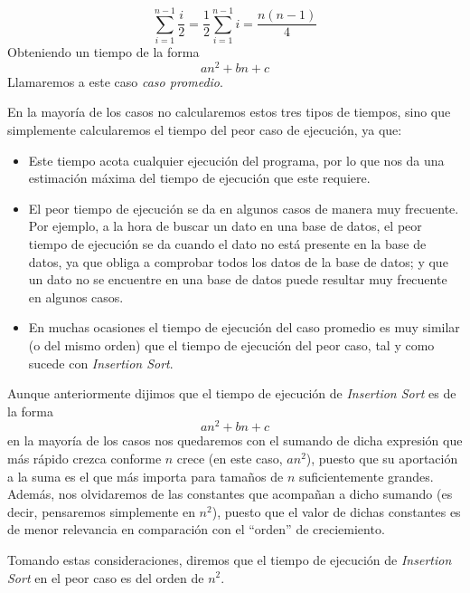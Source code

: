 \begin{itemize}
        \begin{equation*}
            \sum_{i=1}^{n-1} \frac{i}{2} = \frac{1}{2}\sum_{i=1}^{n-1} i = \dfrac{n(n-1)}{4}
        \end{equation*}
        Obteniendo un tiempo de la forma
        \begin{equation*}
            an^2 + bn + c
        \end{equation*}
        Llamaremos a este caso \textit{caso promedio}.
\end{itemize}

En la mayoría de los casos no calcularemos estos tres tipos de tiempos, sino que simplemente calcularemos el tiempo del peor caso de ejecución, ya que:
\begin{itemize}
    \item Este tiempo acota cualquier ejecución del programa, por lo que nos da una estimación máxima del tiempo de ejecución que este requiere.
    \item El peor tiempo de ejecución se da en algunos casos de manera muy frecuente. Por ejemplo, a la hora de buscar un dato en una base de datos, el peor tiempo de ejecución se da cuando el dato no está presente en la base de datos, ya que obliga a comprobar todos los datos de la base de datos; y que un dato no se encuentre en una base de datos puede resultar muy frecuente en algunos casos.
    \item En muchas ocasiones el tiempo de ejecución del caso promedio es muy similar (o del mismo orden) que el tiempo de ejecución del peor caso, tal y como sucede con \textit{Insertion Sort}.
\end{itemize}

Aunque anteriormente dijimos que el tiempo de ejecución de \textit{Insertion Sort} es de la forma
\begin{equation*}
    an^2 + bn + c
\end{equation*}
en la mayoría de los casos nos quedaremos con el sumando de dicha expresión que más rápido crezca conforme $n$ crece (en este caso, $an^2$), puesto que su aportación a la suma es el que más importa para tamaños de $n$ suficientemente grandes. Además, nos olvidaremos de las constantes que acompañan a dicho sumando (es decir, pensaremos simplemente en $n^2$), puesto que el valor de dichas constantes es de menor relevancia en comparación con el ``orden'' de creciemiento. 

Tomando estas consideraciones, diremos que el tiempo de ejecución de \textit{Insertion Sort} en el peor caso es del orden de $n^2$.

